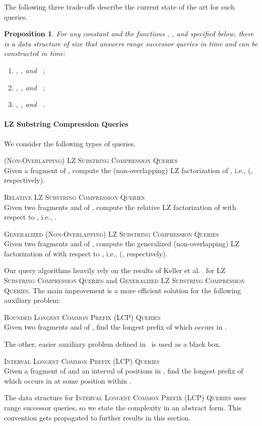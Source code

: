 \documentclass[a4paper]{article}
\newtheorem{proposition}[theorem]{Proposition}
\theoremstyle{definition}
\theoremstyle{remark}
\newcommand{\BLCPFull}{\textsc{Bounded Longest Common Prefix (LCP) Queries}\xspace}
\newcommand{\ILCP}{\textsc{Interval Longest Common Prefix (LCP) Queries}\xspace}
\newcommand{\ILCPFull}{\textsc{Interval Longest Common Prefix (LCP) Queries}\xspace}
\newcommand{\LSC}{\textsc{LZ Substring Compression Queries}\xspace}
\newcommand{\GSC}{\textsc{Generalized LZ Substring Compression Queries}\xspace}
\newenvironment{dsproblem}[1]
{\begin{center}\begin{lrbox}{\mybox}\begin{minipage}{0.96\columnwidth}{\textsc{#1}}\\}
{\end{minipage}\end{lrbox}\fbox{\usebox{\mybox}}\end{center}}
\newcommand{\defdsproblem}[2]{
  \begin{dsproblem}{#1}
#2
  \end{dsproblem}
  }
\begin{document}
The following three trade-offs describe the current state of the art for such queries.
\begin{proposition}\label{prp:range_successor_ub}
For any constant  and the functions , , and  specified below, there is a data structure of size 
  that answers range successor queries in  time and can be constructed in  time:
 \begin{enumerate}[label=(\alph*)]
   \item\label{it:succn} , ,
   and ~\cite{DBLP:conf/swat/NekrichN12,DBLP:conf/soda/BelazzouguiP16};
   \item\label{it:succloglog} , , and ~\cite{DBLP:journals/ipl/Zhou16,Gao2020};
   \item\label{it:succeps} , ,
   and ~\cite{DBLP:journals/tcs/CrochemoreIKRTW12}.
 \end{enumerate}
\end{proposition}


\paragraph{LZ Substring Compression Queries}
We consider the following types of queries.
\defdsproblem{\textsc{(Non-Overlapping) LZ Substring Compression Queries}}{
Given a fragment  of , compute the (non-overlapping) LZ factorization of , i.e.,  (, respectively).
}
\defdsproblem{\textsc{Relative LZ Substring Compression Queries}}{
Given two fragments  and  of , compute the relative LZ factorization of  with respect to , i.e., .
}

\defdsproblem{\textsc{Generalized (Non-Overlapping) LZ Substring Compression Queries}}{
Given two fragments  and  of , compute the generalized (non-overlapping) LZ factorization of  with respect to , i.e., 
(, respectively).
}

Our query algorithms heavily rely on the results of Keller et al.~\cite{DBLP:journals/tcs/KellerKFL14} for \LSC and \GSC. 
The main improvement is a more efficient solution for the following auxiliary problem:
\defdsproblem{\BLCPFull}{Given two fragments  and  of , find the longest prefix  of  which  occurs in .}
The other, easier auxiliary problem defined in~\cite{DBLP:journals/tcs/KellerKFL14} is used as a black box.
\defdsproblem{\ILCPFull}{Given a fragment  of  and an interval  of positions in , 
find the longest prefix  of  which occurs in   at some position within .}

The data structure for \ILCP uses range successor queries, so we state the complexity in an abstract form.
This convention gets propagated to further results in this section.
\end{document}
